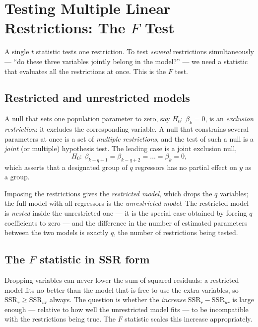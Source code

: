 \section{Testing Multiple Linear Restrictions: The $F$ Test}

A single $t$ statistic tests one restriction. To test \emph{several} restrictions simultaneously --- ``do these three variables jointly belong in the model?'' --- we need a statistic that evaluates all the restrictions at once. This is the $F$ test.

\subsection{Restricted and unrestricted models}

A null that sets one population parameter to zero, say $H_0:\ \beta_k = 0$, is an \emph{exclusion restriction}: it excludes the corresponding variable. A null that constrains several parameters at once is a set of \emph{multiple restrictions}, and the test of such a null is a \emph{joint} (or multiple) hypothesis test. The leading case is a joint exclusion null,
\[
H_0:\ \beta_{k-q+1} = \beta_{k-q+2} = \dots = \beta_k = 0,
\]
which asserts that a designated group of $q$ regressors has no partial effect on $y$ as a group.

Imposing the restrictions gives the \emph{restricted model}, which drops the $q$ variables; the full model with all regressors is the \emph{unrestricted model}. The restricted model is \emph{nested} inside the unrestricted one --- it is the special case obtained by forcing $q$ coefficients to zero --- and the difference in the number of estimated parameters between the two models is exactly $q$, the number of restrictions being tested.

\subsection{The $F$ statistic in SSR form}

Dropping variables can never lower the sum of squared residuals: a restricted model fits no better than the model that is free to use the extra variables, so $\text{SSR}_r \ge \text{SSR}_{ur}$ always. The question is whether the \emph{increase} $\text{SSR}_r - \text{SSR}_{ur}$ is large enough --- relative to how well the unrestricted model fits --- to be incompatible with the restrictions being true. The $F$ statistic scales this increase appropriately.


